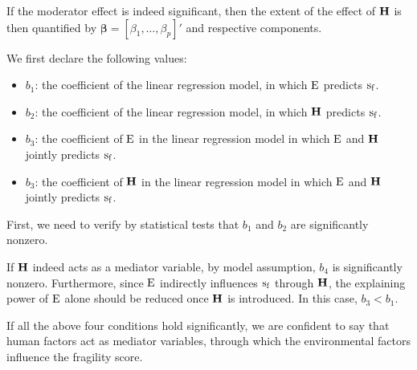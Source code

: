 If the moderator effect is indeed significant, then the extent of the effect of $\operatorname*{\mathbf{H}}$ is then quantified by $\mathbf{\beta} = \left[\beta_1,\ldots,\beta_p\right]'$ and respective components.


We first declare the following values:
\begin{itemize}
   \item $b_1$: the coefficient of the linear regression model, in which $\operatorname*{E}$ predicts $\operatorname*{s_f}$.
   \item $b_2$: the coefficient of the linear regression model, in which $\operatorname*{\mathbf{H}}$ predicts $\operatorname*{s_f}$.
   \item $b_3$: the coefficient of $\operatorname*{E}$ in the linear regression model in which $\operatorname*{E}$ and $\operatorname*{\mathbf{H}}$ jointly predicts $\operatorname*{s_f}$.
   \item $b_3$: the coefficient of $\operatorname*{\mathbf{H}}$ in the linear regression model in which $\operatorname*{E}$ and $\operatorname*{\mathbf{H}}$ jointly predicts $\operatorname*{s_f}$.
\end{itemize}

First, we need to verify by statistical tests that $b_1$ and $b_2$ are significantly nonzero.

If $\operatorname*{\mathbf{H}}$ indeed acts as a mediator variable, by model assumption, $b_4$ is significantly nonzero. Furthermore, since $\operatorname*{E}$ indirectly influences $\operatorname*{s_f}$ through $\operatorname*{\mathbf{H}}$, the explaining power of $\operatorname*{E}$ alone should be reduced once $\operatorname*{\mathbf{H}}$ is introduced. In this case, $b_3 < b_1$.

If all the above four conditions hold significantly, we are confident to say that human factors act as mediator variables, through which the environmental factors influence the fragility score.